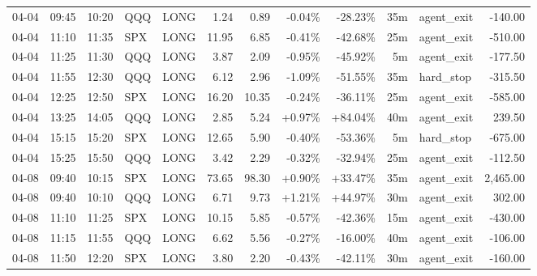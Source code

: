 \documentclass[11pt,a4paper,twoside]{article}
\begin{document}
\begin{center}
\begin{longtable}{>{\color{txtmain}}l l l l l r r r r r >{\color{txtmain}}l r}
04-04 & 09:45 & 10:20 & QQQ & LONG & 1.24 & 0.89 & \textcolor{lossred}{-0.04\%} & \textcolor{lossred}{-28.23\%} & 35m & agent\_exit & \textcolor{lossred}{-140.00} \\
04-04 & 11:10 & 11:35 & SPX & LONG & 11.95 & 6.85 & \textcolor{lossred}{-0.41\%} & \textcolor{lossred}{-42.68\%} & 25m & agent\_exit & \textcolor{lossred}{-510.00} \\
04-04 & 11:25 & 11:30 & QQQ & LONG & 3.87 & 2.09 & \textcolor{lossred}{-0.95\%} & \textcolor{lossred}{-45.92\%} & 5m & agent\_exit & \textcolor{lossred}{-177.50} \\
04-04 & 11:55 & 12:30 & QQQ & LONG & 6.12 & 2.96 & \textcolor{lossred}{-1.09\%} & \textcolor{lossred}{-51.55\%} & 35m & hard\_stop & \textcolor{lossred}{-315.50} \\
04-04 & 12:25 & 12:50 & SPX & LONG & 16.20 & 10.35 & \textcolor{lossred}{-0.24\%} & \textcolor{lossred}{-36.11\%} & 25m & agent\_exit & \textcolor{lossred}{-585.00} \\
04-04 & 13:25 & 14:05 & QQQ & LONG & 2.85 & 5.24 & \textcolor{wingreen}{+0.97\%} & \textcolor{wingreen}{+84.04\%} & 40m & agent\_exit & \textcolor{wingreen}{239.50} \\
04-04 & 15:15 & 15:20 & SPX & LONG & 12.65 & 5.90 & \textcolor{lossred}{-0.40\%} & \textcolor{lossred}{-53.36\%} & 5m & hard\_stop & \textcolor{lossred}{-675.00} \\
04-04 & 15:25 & 15:50 & QQQ & LONG & 3.42 & 2.29 & \textcolor{lossred}{-0.32\%} & \textcolor{lossred}{-32.94\%} & 25m & agent\_exit & \textcolor{lossred}{-112.50} \\
04-08 & 09:40 & 10:15 & SPX & LONG & 73.65 & 98.30 & \textcolor{wingreen}{+0.90\%} & \textcolor{wingreen}{+33.47\%} & 35m & agent\_exit & \textcolor{wingreen}{2,465.00} \\
04-08 & 09:40 & 10:10 & QQQ & LONG & 6.71 & 9.73 & \textcolor{wingreen}{+1.21\%} & \textcolor{wingreen}{+44.97\%} & 30m & agent\_exit & \textcolor{wingreen}{302.00} \\
04-08 & 11:10 & 11:25 & SPX & LONG & 10.15 & 5.85 & \textcolor{lossred}{-0.57\%} & \textcolor{lossred}{-42.36\%} & 15m & agent\_exit & \textcolor{lossred}{-430.00} \\
04-08 & 11:15 & 11:55 & QQQ & LONG & 6.62 & 5.56 & \textcolor{lossred}{-0.27\%} & \textcolor{lossred}{-16.00\%} & 40m & agent\_exit & \textcolor{lossred}{-106.00} \\
04-08 & 11:50 & 12:20 & SPX & LONG & 3.80 & 2.20 & \textcolor{lossred}{-0.43\%} & \textcolor{lossred}{-42.11\%} & 30m & agent\_exit & \textcolor{lossred}{-160.00} \\

\end{longtable}
\end{center}
\end{document}
